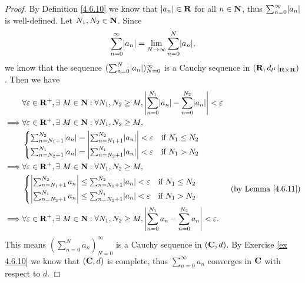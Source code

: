 \begin{proof}
    By Definition \ref{4.6.10} we know that \(\left\lvert a_n\right\rvert \in \mathbf{R}\) for all \(n \in \mathbf{N}\), thus \(\sum_{n = 0}^\infty \abs{a_n}\) is well-defined.
    Let \(N_1, N_2 \in \mathbf{N}\).
    Since
    \[
        \sum_{n = 0}^\infty \abs{a_n} = \lim_{N \to \infty} \sum_{n = 0}^N \abs{a_n},
    \]
    we know that the sequence \((\sum_{n = 0}^N \abs{a_n})_{N = 0}^\infty\) is a Cauchy sequence in \((\mathbf{R}, d_{l^1}|_{\mathbf{R} \times \mathbf{R}})\).
    Then we have
    \begin{align*}
                 & \forall \varepsilon \in \R^+, \exists\ M \in \N : \forall N_1, N_2 \geq M, \abs{\sum_{n = 0}^{N_1} \abs{a_n} - \sum_{n = 0}^{N_2} \abs{a_n}} < \varepsilon \\
        \implies & \forall \varepsilon \in \R^+, \exists\ M \in \N : \forall N_1, N_2 \geq M,                                                                                 \\
                 & \begin{cases}
                       \sum_{n = N_1 + 1}^{N_2} \abs{a_n} = \abs{\sum_{n = N_1 + 1}^{N_2} \abs{a_n}} < \varepsilon & \text{if } N_1 \leq N_2 \\
                       \sum_{n = N_2 + 1}^{N_1} \abs{a_n} = \abs{\sum_{n = N_2 + 1}^{N_1} \abs{a_n}} < \varepsilon & \text{if } N_1 > N_2
                   \end{cases}                       \\
        \implies & \forall \varepsilon \in \R^+, \exists\ M \in \N : \forall N_1, N_2 \geq M,                                                                                 \\
                 & \begin{cases}
                       \abs{\sum_{n = N_1 + 1}^{N_2} a_n} \leq \sum_{n = N_1 + 1}^{N_2} \abs{a_n} < \varepsilon & \text{if } N_1 \leq N_2 \\
                       \abs{\sum_{n = N_2 + 1}^{N_1} a_n} \leq \sum_{n = N_2 + 1}^{N_1} \abs{a_n} < \varepsilon & \text{if } N_1 > N_2
                   \end{cases}                                      & \text{(by Lemma \ref{4.6.11})}                                         \\
        \implies & \forall \varepsilon \in \R^+, \exists\ M \in \N : \forall N_1, N_2 \geq M, \abs{\sum_{n = 0}^{N_1} a_n - \sum_{n = 0}^{N_2} a_n} < \varepsilon.
    \end{align*}
    This means \((\sum_{n = 0}^N a_n)_{N = 0}^\infty\) is a Cauchy sequence in \((\mathbf{C}, d)\).
    By Exercise \ref{ex 4.6.10} we know that \((\mathbf{C}, d)\) is complete, thus \(\sum_{n = 0}^\infty a_n\) converges in \(\mathbf{C}\) with respect to \(d\).
\end{proof}

